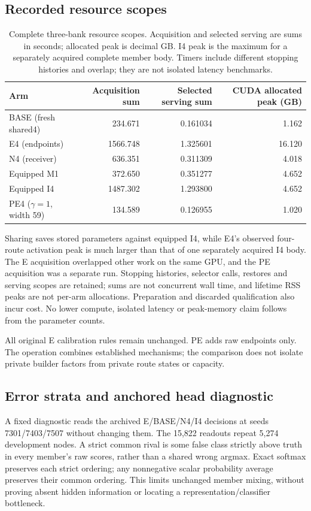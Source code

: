 \subsection{Recorded resource scopes}
\begin{table}[t]
\centering\small\setlength{\tabcolsep}{5pt}
\caption{Complete three-bank resource scopes. Acquisition and selected serving are sums in seconds; allocated peak is decimal GB. I4 peak is the maximum for a separately acquired complete member body. Timers include different stopping histories and overlap; they are not isolated latency benchmarks.}
\label{tab:E-PE-costs}
\begin{tabular}{lrrr}
\toprule
Arm & Acquisition sum & Selected serving sum & CUDA allocated peak (GB)\\
\midrule
BASE (fresh shared4) & 234.671 & 0.161034 & 1.162\\
E4 (endpoints) & 1566.748 & 1.325601 & 16.120\\
N4 (receiver) & 636.351 & 0.311309 & 4.018\\
Equipped M1 & 372.650 & 0.351277 & 4.652\\
Equipped I4 & 1487.302 & 1.293800 & 4.652\\
PE4 ($\gamma=1$, width 59) & 134.589 & 0.126955 & 1.020\\
\bottomrule\end{tabular}\end{table}

Sharing saves stored parameters against equipped I4, while E4's observed four-route activation peak is much larger than that of one separately acquired I4 body. The E acquisition overlapped other work on the same GPU, and the PE acquisition was a separate run. Stopping histories, selector calls, restores and serving scopes are retained; sums are not concurrent wall time, and lifetime RSS peaks are not per-arm allocations. Preparation and discarded qualification also incur cost. No lower compute, isolated latency or peak-memory claim follows from the parameter counts.

All original E calibration rules remain unchanged. PE adds raw endpoints only. The operation combines established mechanisms; the comparison does not isolate private builder factors from private route states or capacity.

\subsection{Error strata and anchored head diagnostic}\label{app:E-error-head}
A fixed diagnostic reads the archived E/BASE/N4/I4 decisions at seeds 7301/7403/7507 without changing them. The 15,822 readouts repeat 5,274 development nodes. A strict common rival is some false class strictly above truth in every member's raw scores, rather than a shared wrong argmax. Exact softmax preserves each strict ordering; any nonnegative scalar probability average preserves their common ordering. This limits unchanged member mixing, without proving absent hidden information or locating a representation/classifier bottleneck.

